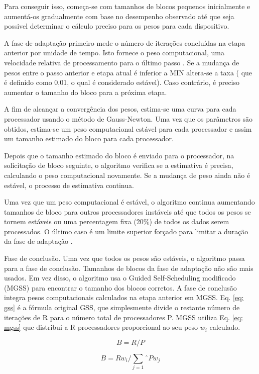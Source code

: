 Para conseguir isso, começa-se com tamanhos de blocos pequenos inicialmente e aumentá-os gradualmente com base no desempenho observado até que seja possivel determinar o cálculo preciso para os pesos para cada dispositivo.

A fase de adaptação primeiro mede o número de iterações concluídas na etapa anterior por unidade de tempo. Isto fornece o peso computacional, uma velocidade relativa de processamento para o último passo . Se a mudança de pesos entre o passo anterior e etapa atual é inferior a MIN altera-se a taxa ( que é definido como 0,01, o qual é considerado estável). Caso contrário, é preciso aumentar o tamanho do bloco para a próxima etapa.

A fim de alcançar a convergência dos pesos, estima-se uma curva para cada processador usando o método de Gauss-Newton. Uma vez que os parâmetros são obtidos, estima-se um peso computacional estável para cada processador e assim um tamanho estimado do bloco para cada processador.

Depois que o tamanho estimado do bloco é enviado para o processador, na solicitação de bloco seguinte, o algoritmo verifica se a estimativa é precisa, calculando o peso computacional novamente. Se a mudança de peso ainda não é estável, o processo de estimativa continua.

Uma vez que um peso computacional é  estável, o algoritmo continua aumentando tamanhos de bloco para outros processadores instáveis ​​até que todos os pesos se tornem estáveis ou uma percentagem fixa (20\%) de todos os dados serem processados. O último caso é um limite superior forçado para limitar a duração da fase de adaptação .

Fase de conclusão. Uma vez que todos os pesos são estáveis​​, o algoritmo passa para a fase de conclusão. Tamanhos de blocos da fase de adaptação não são mais usados. Em vez disso, o algoritmo usa o Guided Self-Scheduling modificado (MGSS) para encontrar o tamanho dos blocos corretos. A fase de conclusão integra pesos computacionais calculados na etapa anterior em MGSS. Eq. \ref{eq: gss} é a fórmula original GSS, que simplesmente divide o restante número de iterações de R para o número total de processadores P. MGSS utiliza Eq. \ref{eq: mgss} que distribui a R processadores proporcional ao seu peso $w_i$ calculado.

\begin{equation}
 	B = R/P
\end{equation}

\begin{equation}
 	B = R w_i/ \sum_{j=1}ˆ{P} w_j
\end{equation}

